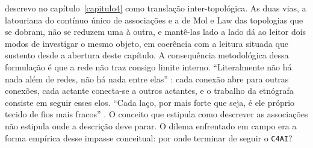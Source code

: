 descrevo no capítulo~\ref{capitulo4} como translação inter-topológica. As duas vias, a latouriana do contínuo único de associações e a de Mol e Law das topologias que se dobram, não se reduzem uma à outra, e mantê-las lado a lado dá ao leitor dois modos de investigar o mesmo objeto, em coerência com a leitura situada que sustento desde a abertura deste capítulo.
A consequência metodológica dessa formulação é que a rede não traz consigo limite interno. ``Literalmente não há nada além de redes, não há nada entre elas'' \parencite[p.~4]{latour1996clarifications}: cada conexão abre para outras conexões, cada actante conecta-se a outros actantes, e o trabalho da etnógrafa consiste em seguir esses elos. ``Cada laço, por mais forte que seja, é ele próprio tecido de fios mais fracos'' \parencite[p.~3]{latour1996clarifications}. O conceito que estipula como descrever as associações não estipula onde a descrição deve parar. O dilema enfrentado em campo era a forma empírica desse impasse conceitual: por onde terminar de seguir o \texttt{C4AI}?

